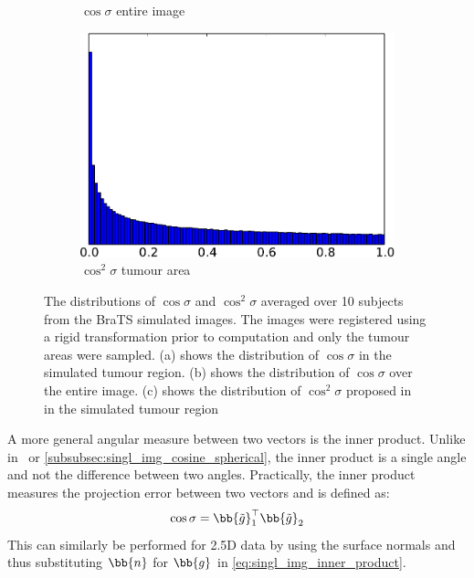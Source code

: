 \begin{figure}
\begin{subfigure}[t]{0.32\textwidth}
        \caption{$\cos{\sigma}$ entire image}\label{subfig:singl_img_inner_product_all}
    \end{subfigure} \hfill
    \begin{subfigure}[t]{0.32\textwidth}
        \centering
        \includegraphics[width=\textwidth]{statistical_normals/images/distributions/inner_product_squared_tumour-crop}
        \caption{$\cos^{2}{\sigma}$ tumour area}\label{subfig:singl_img_inner_product_squared_tumour}
    \end{subfigure}
    \hspace*{\fill}
    \caption{The distributions of $\cos{\sigma}$ and $\cos^2{\sigma}$ averaged
             over 10 subjects from the BraTS simulated images. The images were
             registered using a rigid transformation prior to computation and
             only the tumour areas were sampled. (a) shows the distribution of
             $\cos{\sigma}$ in the simulated tumour region. (b) shows the
             distribution of $\cos{\sigma}$ over the entire image. (c) shows the
             distribution of $\cos^2{\sigma}$ proposed
             in~\cite{haber2006intensity} in the simulated tumour region}
\label{fig:singl_img_inner_product_distributions}
\end{figure}
A more general angular measure between two vectors is the inner product. Unlike
in~\cite{tzimiropoulos2012subspace,tzimiropoulos2011robust} or
\cref{subsubsec:singl_img_cosine_spherical}, the inner
product is a single angle and not the difference between two angles.
Practically, the inner product measures the projection error between two vectors
and is defined as:
\begin{equation}\label{eq:singl_img_inner_product}
    \cos{\sigma} = \bb{\tilde{g}}_{1}^{\top} \bb{\tilde{g}}_{2}
\end{equation}
This can similarly be performed for 2.5D data by using the surface normals and
thus substituting $\bb{n}$ for $\bb{g}$ in \cref{eq:singl_img_inner_product}.

